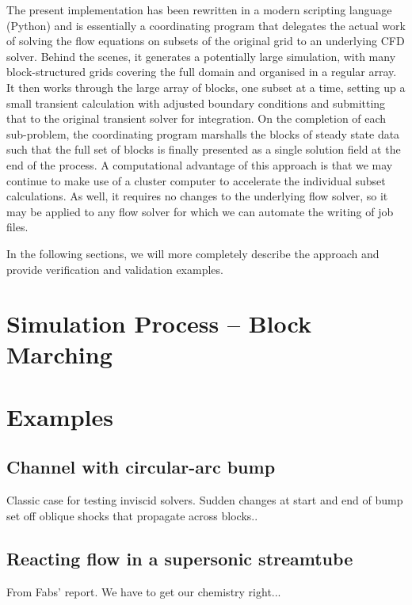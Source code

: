 \documentclass[12pt,a4paper,twoside]{article}
\begin{document}
\medskip
The present implementation has been rewritten in a modern scripting language (Python) 
and is essentially a coordinating program that delegates the actual work 
of solving the flow equations on subsets of the original grid to an underlying CFD solver.  
Behind the scenes, it generates a potentially large simulation, 
with many block-structured grids covering the full domain and organised in a regular array.  
It then works through the large array of blocks, one subset at a time, 
setting up a small transient calculation with adjusted boundary conditions and 
submitting that to the original transient solver for integration.  
On the completion of each sub-problem, the coordinating program marshalls the blocks 
of steady state data such that the full set of blocks is finally presented 
as a single solution field at the end of the process.  
A computational advantage of this approach is that we may continue to make use 
of a cluster computer to accelerate the individual subset calculations.  
As well, it requires no changes to the underlying flow solver, 
so it may be applied to any flow solver for which we can automate the writing of job files. 

\medskip
In the following sections, we will more completely describe the approach 
and provide verification and validation examples.  

\section{Simulation Process -- Block Marching}

\clearpage
\section{Examples}

\subsection{Channel with circular-arc bump}
%
Classic case for testing inviscid solvers.  
Sudden changes at start and end of bump set off oblique shocks that propagate across blocks..


\subsection{Reacting flow in a supersonic streamtube}
%
From Fabs' report.  
We have to get our chemistry right...
\end{document}
